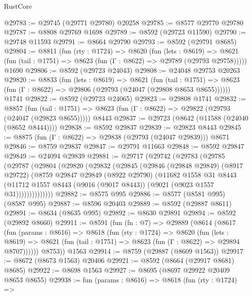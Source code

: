 \begin{lexlean}{RustCore}
\begin{coremodule}
@29783 := @29745 (@29771 @29780) @20258
@29785 := @8577 @29770 @29780
@29787 := @8808 @29769 @1698
@29789 := @8592 (@29723 @11590)
@29790 := @29748 @11593
@29791 := @8664 @29790
@29793 := @8592 (@29791 @8685)
@29804 := @8811
    (fun (rty : @1724) =>
    @8620
      (fun (lets : @8619) =>
      @8621 (fun (tail : @1751) => @8623 (fun (Γ : @8622) => @29789 (@29793 @29758)))))
    @1690
@29806 := @8592 (@29723 @24043)
@29808 := @24048 @29753 @20263
@29820 := @8833
    (fun (lets : @8619) =>
    @8621
      (fun (tail : @1751) =>
      @8623 (fun (Γ : @8622) => @29806 (@29793 (@24047 (@29808 @8653 @8655))))))
    @1741
@29822 := @8592 (@29723 @24065)
@29823 := @29808 @1741
@29832 := @8857
    (fun (tail : @1751) => @8623 (fun (Γ : @8622) => @29822 (@29793 (@24047 (@29823 @8655)))))
    @8443
@29837 := @29723 (@8642 (@11588 (@24040 (@8652 @8444))))
@29838 := @8592 @29837
@29839 := @29823 @8443
@29845 := @8875 (fun (Γ : @8622) => @29838 (@29793 (@24047 @29839))) @8671
@29846 := @8759 @29837
@29847 := @29791 @11663
@29848 := @8592 @29847
@29849 := @24094 @29839
@29881 := @29717
    (@29742
      (@29783
        (@29785
          (@29787
            (@29804
              (@29820
                (@29832
                  (@29845
                    (@29846
                      (@29848 @29849)
                      (@8917 @29722)
                      (@8759
                        @29847
                        @29849
                        (@8922 @29790)
                        (@11682
                          @1558
                          @31
                          @8443
                          (@11712
                            @1557
                            @8443
                            (@9016 (@9017 @8443))
                            (@9021 (@9023 @1557 @31))))))))))))))
@29882 := @8575 @995
@29886 := @8577 (@8581 @995) (@8587 @995)
@29887 := @8596 @20403
@29889 := @8592 (@29887 @8611)
@29891 := @8634 (@8635 @995)
@29892 := @8630 @29891
@29894 := @8592 (@29892 @8660)
@29911 := @8591
    (fun (fn : @7) =>
    @29889
      (@8614
        (@8617
          (fun (params : @8616) =>
          @8618
            (fun (rty : @1724) =>
            @8620
              (fun (lets : @8619) =>
              @8621 (fun (tail : @1751) => @8623 (fun (Γ : @8622) => @29894 @8707))))))
        @8753))
    @1563
@29914 := @8759 (@29887 (@8609 @1563))
@29917 := @8672 (@8673 @1563) @20406
@29921 := @8592 (@8664 (@29917 @8681) @8685)
@29922 := @8698 @1563
@29927 := @8695 (@8697 @29922 @20409 @8653 @8655)
@29938 := fun (params : @8616) =>
  @8618
    (fun (rty : @1724) =>

\end{coremodule}
\end{lexlean}
